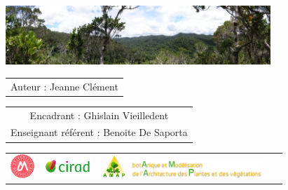 {

  \begin{frame}
    \vspace{0.25cm}
    \titlepage %
    \vspace{-2.5cm}
    \begin{center}
      \includegraphics[width=10cm]{figs/Banniere.png}
    \end{center}
    \begin{center}
          \vspace{0.2cm}
        \begin{tabular}{c}
         Auteur : Jeanne Clément
        \end{tabular}
    
{\small \begin{tabular}{c}
Encadrant : Ghislain Vieilledent \\
Enseignant référent : Benoite De Saporta  
\end{tabular}}

      \vspace{0.2cm}

      \begin{tabular}{C{2cm}C{2cm}C{2cm}C{3cm}}
        \includegraphics[height=0.9cm]{figs/logo_UM.jpg} &
        \includegraphics[height=0.6cm]{figs/logo_Cirad.png} &
        \includegraphics[height=0.9cm]{figs/logo_AMAP.png}
        \includegraphics[height=0.7cm]{figs/AMAP-titre-long.png} &
        ~
      \end{tabular}
      
\end{center}
\end{frame}
}
